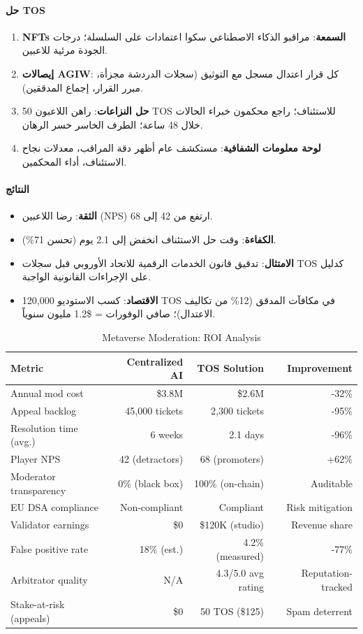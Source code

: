 \documentclass[11pt]{article}
\begin{document}
\paragraph{حل TOS}
\begin{enumerate}[noitemsep]
  \item \textbf{NFTs السمعة}: مراقبو الذكاء الاصطناعي سكوا اعتمادات على السلسلة؛ درجات الجودة مرئية للاعبين.
  \item \textbf{إيصالات AGIW}: كل قرار اعتدال مسجل مع التوثيق (سجلات الدردشة مجزأة، مبرر القرار، إجماع المدققين).
  \item \textbf{حل النزاعات}: راهن اللاعبون 50 TOS للاستئناف؛ راجع محكمون خبراء الحالات خلال 48 ساعة؛ الطرف الخاسر خسر الرهان.
  \item \textbf{لوحة معلومات الشفافية}: مستكشف عام أظهر دقة المراقب، معدلات نجاح الاستئناف، أداء المحكمين.
\end{enumerate}

\paragraph{النتائج}
\begin{itemize}[noitemsep]
  \item \textbf{الثقة}: رضا اللاعبين (NPS) ارتفع من 42 إلى 68.
  \item \textbf{الكفاءة}: وقت حل الاستئناف انخفض إلى 2.1 يوم (تحسن 71\%).
  \item \textbf{الامتثال}: تدقيق قانون الخدمات الرقمية للاتحاد الأوروبي قبل سجلات TOS كدليل على الإجراءات القانونية الواجبة.
  \item \textbf{الاقتصاد}: كسب الاستوديو 120,000 TOS في مكافآت المدقق (12\% من تكاليف الاعتدال)؛ صافي الوفورات = \$1.2 مليون سنوياً.
\end{itemize}

\begin{table}[H]
\centering
\caption{Metaverse Moderation: ROI Analysis}
\label{tab:metaverse-roi}
\begin{tabular}{@{}lrrr@{}}
\toprule
\textbf{Metric} & \textbf{Centralized AI} & \textbf{TOS Solution} & \textbf{Improvement} \\ \midrule
Annual mod cost & \$3.8M & \$2.6M & -32\% \\
Appeal backlog & 45,000 tickets & 2,300 tickets & -95\% \\
Resolution time (avg.) & 6 weeks & 2.1 days & -96\% \\
Player NPS & 42 (detractors) & 68 (promoters) & +62\% \\
Moderator transparency & 0\% (black box) & 100\% (on-chain) & Auditable \\
EU DSA compliance & Non-compliant & Compliant & Risk mitigation \\
Validator earnings & \$0 & \$120K (studio) & Revenue share \\
False positive rate & 18\% (est.) & 4.2\% (measured) & -77\% \\
Arbitrator quality & N/A & 4.3/5.0 avg rating & Reputation-tracked \\
Stake-at-risk (appeals) & \$0 & 50 TOS (\$125) & Spam deterrent \\
\bottomrule
\end{tabular}
\end{table}
\end{document}
